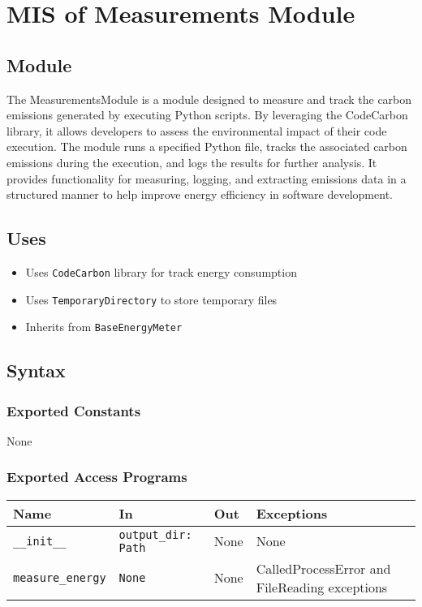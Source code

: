 \documentclass[12pt, titlepage]{article}
\begin{document}
\section{MIS of Measurements Module}

\subsection{Module}

The MeasurementsModule is a module designed to measure and track the carbon emissions generated by executing Python scripts. By leveraging the CodeCarbon library, it allows developers to assess the environmental impact of their code execution. The module runs a specified Python file, tracks the associated carbon emissions during the execution, and logs the results for further analysis. It provides functionality for measuring, logging, and extracting emissions data in a structured manner to help improve energy efficiency in software development.

\subsection{Uses}

\begin{itemize}
    \item Uses \texttt{CodeCarbon} library for track energy consumption
    \item Uses \texttt{TemporaryDirectory} to store temporary files
    \item Inherits from \texttt{BaseEnergyMeter}
\end{itemize}

\subsection{Syntax}

\subsubsection{Exported Constants}
None

\subsubsection{Exported Access Programs}

\begin{center}
\begin{tabular}{|p{3cm}|p{5cm}|p{2cm}|p{3cm}|}
\hline
\textbf{Name} & \textbf{In} & \textbf{Out} & \textbf{Exceptions} \\
\hline
\texttt{\_\_init\_\_} & \texttt{output\_dir: Path} & None & None \\
\hline
\texttt{measure\_energy} & \texttt{None} & None & CalledProcessError and FileReading exceptions \\
\hline
\end{tabular}
\end{center}
\end{document}
